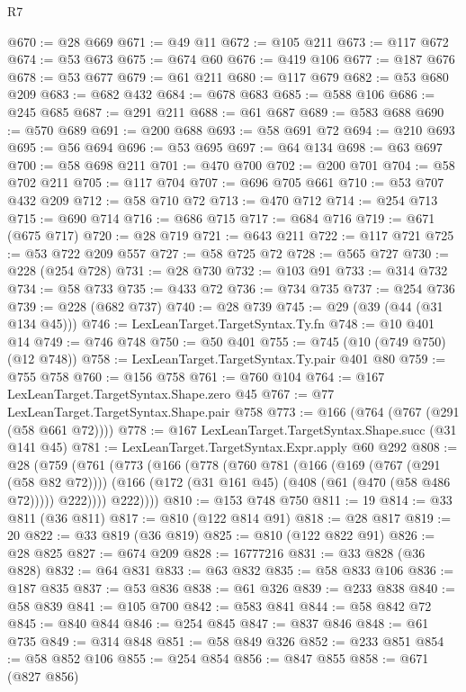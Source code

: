 \begin{lexlean}{R7}
\begin{coremodule}
@670 := @28 @669
@671 := @49 @11
@672 := @105 @211
@673 := @117 @672
@674 := @53 @673
@675 := @674 @60
@676 := @419 @106
@677 := @187 @676
@678 := @53 @677
@679 := @61 @211
@680 := @117 @679
@682 := @53 @680 @209
@683 := @682 @432
@684 := @678 @683
@685 := @588 @106
@686 := @245 @685
@687 := @291 @211
@688 := @61 @687
@689 := @583 @688
@690 := @570 @689
@691 := @200 @688
@693 := @58 @691 @72
@694 := @210 @693
@695 := @56 @694
@696 := @53 @695
@697 := @64 @134
@698 := @63 @697
@700 := @58 @698 @211
@701 := @470 @700
@702 := @200 @701
@704 := @58 @702 @211
@705 := @117 @704
@707 := @696 @705 @661
@710 := @53 @707 @432 @209
@712 := @58 @710 @72
@713 := @470 @712
@714 := @254 @713
@715 := @690 @714
@716 := @686 @715
@717 := @684 @716
@719 := @671 (@675 @717)
@720 := @28 @719
@721 := @643 @211
@722 := @117 @721
@725 := @53 @722 @209 @557
@727 := @58 @725 @72
@728 := @565 @727
@730 := @228 (@254 @728)
@731 := @28 @730
@732 := @103 @91
@733 := @314 @732
@734 := @58 @733
@735 := @433 @72
@736 := @734 @735
@737 := @254 @736
@739 := @228 (@682 @737)
@740 := @28 @739
@745 := @29 (@39 (@44 (@31 @134 @45)))
@746 := LexLeanTarget.TargetSyntax.Ty.fn
@748 := @10 @401 @14
@749 := @746 @748
@750 := @50 @401
@755 := @745 (@10 (@749 @750) (@12 @748))
@758 := LexLeanTarget.TargetSyntax.Ty.pair @401 @80
@759 := @755 @758
@760 := @156 @758
@761 := @760 @104
@764 := @167 LexLeanTarget.TargetSyntax.Shape.zero @45
@767 := @77 LexLeanTarget.TargetSyntax.Shape.pair @758
@773 := @166 (@764 (@767 (@291 (@58 @661 @72))))
@778 := @167 LexLeanTarget.TargetSyntax.Shape.succ (@31 @141 @45)
@781 := LexLeanTarget.TargetSyntax.Expr.apply @60 @292
@808 := @28
    (@759
      (@761
        (@773
          (@166
            (@778
              (@760
                @781
                (@166
                  (@169 (@767 (@291 (@58 @82 @72))))
                  (@166 (@172 (@31 @161 @45) (@408 (@61 (@470 (@58 @486 @72))))) @222))))
            @222))))
@810 := @153 @748 @750
@811 := 19
@814 := @33 @811 (@36 @811)
@817 := @810 (@122 @814 @91)
@818 := @28 @817
@819 := 20
@822 := @33 @819 (@36 @819)
@825 := @810 (@122 @822 @91)
@826 := @28 @825
@827 := @674 @209
@828 := 16777216
@831 := @33 @828 (@36 @828)
@832 := @64 @831
@833 := @63 @832
@835 := @58 @833 @106
@836 := @187 @835
@837 := @53 @836
@838 := @61 @326
@839 := @233 @838
@840 := @58 @839
@841 := @105 @700
@842 := @583 @841
@844 := @58 @842 @72
@845 := @840 @844
@846 := @254 @845
@847 := @837 @846
@848 := @61 @735
@849 := @314 @848
@851 := @58 @849 @326
@852 := @233 @851
@854 := @58 @852 @106
@855 := @254 @854
@856 := @847 @855
@858 := @671 (@827 @856)

\end{coremodule}
\end{lexlean}
